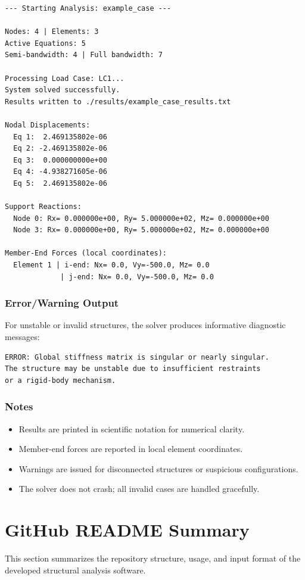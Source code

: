 \begin{verbatim}
--- Starting Analysis: example_case ---

Nodes: 4 | Elements: 3
Active Equations: 5
Semi-bandwidth: 4 | Full bandwidth: 7

Processing Load Case: LC1...
System solved successfully.
Results written to ./results/example_case_results.txt

Nodal Displacements:
  Eq 1:  2.469135802e-06
  Eq 2: -2.469135802e-06
  Eq 3:  0.000000000e+00
  Eq 4: -4.938271605e-06
  Eq 5:  2.469135802e-06

Support Reactions:
  Node 0: Rx= 0.000000e+00, Ry= 5.000000e+02, Mz= 0.000000e+00
  Node 3: Rx= 0.000000e+00, Ry= 5.000000e+02, Mz= 0.000000e+00

Member-End Forces (local coordinates):
  Element 1 | i-end: Nx= 0.0, Vy=-500.0, Mz= 0.0
             | j-end: Nx= 0.0, Vy=-500.0, Mz= 0.0
\end{verbatim}

\subsubsection*{Error/Warning Output}

For unstable or invalid structures, the solver produces informative diagnostic messages:

\begin{verbatim}
ERROR: Global stiffness matrix is singular or nearly singular.
The structure may be unstable due to insufficient restraints
or a rigid-body mechanism.
\end{verbatim}

\subsubsection*{Notes}

\begin{itemize}
    \item Results are printed in scientific notation for numerical clarity.
    \item Member-end forces are reported in local element coordinates.
    \item Warnings are issued for disconnected structures or suspicious configurations.
    \item The solver does not crash; all invalid cases are handled gracefully.
\end{itemize}

\section{GitHub README Summary}
This section summarizes the repository structure, usage, and input format of the developed structural analysis software.

